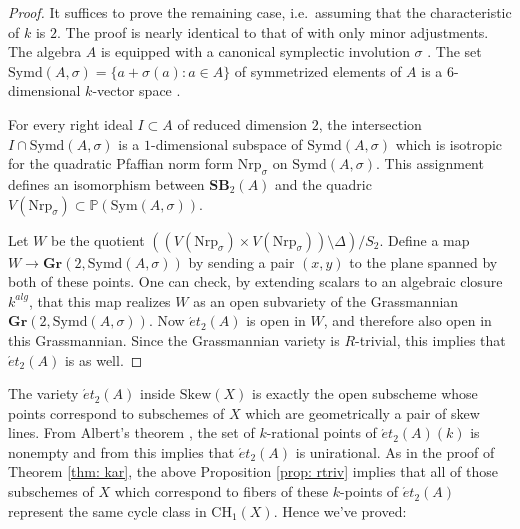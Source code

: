 \documentclass[12pt]{amsart}
\theoremstyle{definition}
\newcommand{\CH}{\mathrm{CH}}
\newcommand{\SB}{\mathbf{SB}}
\begin{document}
\begin{proof}
It suffices to prove the remaining case, i.e.\ assuming that the characteristic of $k$ is $2$. The proof is nearly identical to that of \cite[Theorem 6.6]{MR2601007} with only minor adjustments. The algebra $A$ is equipped with a canonical symplectic involution $\sigma$ \cite[Proposition 2.23]{MR1632779}. The set $\mathrm{Symd}(A,\sigma)=\{a+\sigma(a): a\in A\}$ of symmetrized elements of $A$ is a 6-dimensional $k$-vector space \cite[Proposition 2.6 (2)]{MR1632779}. 

For every right ideal $I\subset A$ of reduced dimension $2$, the intersection $I\cap \mathrm{Symd}(A,\sigma)$ is a $1$-dimensional subspace of $\mathrm{Symd}(A,\sigma)$ which is isotropic for the quadratic Pfaffian norm form $\mathrm{Nrp}_\sigma$ on $\mathrm{Symd}(A,\sigma)$. This assignment defines an isomorphism \cite[Proposition 15.20]{MR1632779} between $\SB_2(A)$ and the quadric $V(\mathrm{Nrp}_\sigma)\subset \mathbb{P}(\mathrm{Sym}(A,\sigma))$.

Let $W$ be the quotient $((V(\mathrm{Nrp}_\sigma)\times V(\mathrm{Nrp}_\sigma))\setminus \Delta)/S_2$. Define a map $W\rightarrow \mathbf{Gr}(2,\mathrm{Symd}(A,\sigma))$ by sending a pair $(x,y)$ to the plane spanned by both of these points. One can check, by extending scalars to an algebraic closure $k^{alg}$, that this map realizes $W$ as an open subvariety of the Grassmannian $\mathbf{Gr}(2,\mathrm{Symd}(A,\sigma))$. Now $\acute{e}t_2(A)$ is open in $W$, and therefore also open in this Grassmannian. Since the Grassmannian variety is $R$-trivial, this implies that $\acute{e}t_2(A)$ is as well.
\end{proof}

The variety $\acute{e}t_2(A)$ inside $\mathrm{Skew}(X)$ is exactly the open subscheme whose points correspond to subschemes of $X$ which are geometrically a pair of skew lines. From Albert's theorem \cite[\S XI.6 Theorem 9]{MR0000595}, the set of $k$-rational points of $\acute{e}t_2(A)(k)$ is nonempty and from \cite[Proposition 6.2]{MR2601007} this implies that $\acute{e}t_2(A)$ is unirational. As in the proof of Theorem \ref{thm: kar}, the above Proposition \ref{prop: rtriv} implies that all of those subschemes of $X$ which correspond to fibers of these $k$-points of $\acute{e}t_2(A)$ represent the same cycle class in $\CH_1(X)$. Hence we've proved:
\end{document}
